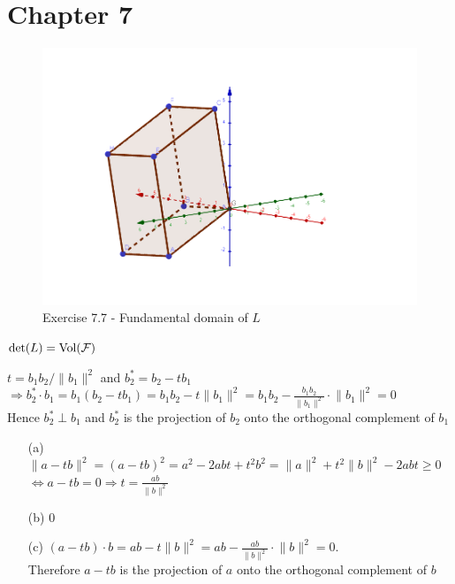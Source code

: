 \chapter*{Chapter 7}

\begin{exer}[7.7]
	\begin{figure}[h]
		\includegraphics[width=\textwidth]{exercise-7-7.png}
		\caption{Exercise 7.7 - Fundamental domain of $L$}
	\end{figure}
	$\det (L) = \operatorname*{Vol} (\mathcal{F})$
\end{exer}

\begin{exer}[7.43] $t = b_1 b_2 / \lVert b_1 \rVert^2$ and $b_2^* = b_2 - tb_1$ \\ $\Rightarrow b_2^* \cdot b_1 = b_1 (b_2 - tb_1) = b_1 b_2 - t \lVert b_1 \rVert^2 = b_1 b_2 - \frac{b_1 b_2}{\lVert b_1 \rVert^2} \cdot \lVert b_1 \rVert^2 = 0$ \\ Hence $b_2^* \perp b_1$ and $b_2^*$ is the projection of $b_2$ onto the orthogonal complement of $b_1$
\end{exer}

\begin{exer}[7.44]
	\begin{enumerate}
		\item [(a)] $\lVert a - tb \rVert^2 = (a - tb)^2 = a^2 - 2abt + t^2b^2 = \lVert a\rVert^2 + t^2 \lVert b\rVert^2 - 2abt \geq 0$ \\ $\Leftrightarrow a - tb = 0 \Rightarrow t = \frac{ab}{\lVert b \rVert^2}$
		\item [(b)] 0
		\item [(c)] $(a - tb)\cdot b = ab - t \lVert b \rVert^2 = ab - \frac{ab}{\lVert b \rVert^2} \cdot \lVert b \rVert^2 = 0$. \\ Therefore $a - tb$ is the projection of $a$ onto the orthogonal complement of $b$
	\end{enumerate}
\end{exer}


